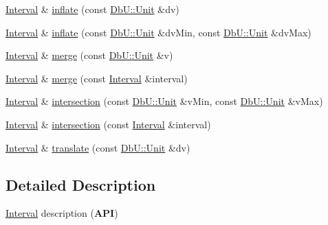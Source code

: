 \begin{DoxyCompactItemize}
\hyperlink{classHurricane_1_1Interval}{Interval} \& \hyperlink{classHurricane_1_1Interval_a142c3ec37ebe74c253b3fe0039ef2143}{inflate} (const \hyperlink{group__DbUGroup_ga4fbfa3e8c89347af76c9628ea06c4146}{Db\-U\-::\-Unit} \&dv)
\item 
\hyperlink{classHurricane_1_1Interval}{Interval} \& \hyperlink{classHurricane_1_1Interval_ac311880a39d8e3db79bcbc5d3bb341a6}{inflate} (const \hyperlink{group__DbUGroup_ga4fbfa3e8c89347af76c9628ea06c4146}{Db\-U\-::\-Unit} \&dv\-Min, const \hyperlink{group__DbUGroup_ga4fbfa3e8c89347af76c9628ea06c4146}{Db\-U\-::\-Unit} \&dv\-Max)
\item 
\hyperlink{classHurricane_1_1Interval}{Interval} \& \hyperlink{classHurricane_1_1Interval_a927e2fbaa8f38a069c6308f7cacc8ab5}{merge} (const \hyperlink{group__DbUGroup_ga4fbfa3e8c89347af76c9628ea06c4146}{Db\-U\-::\-Unit} \&v)
\item 
\hyperlink{classHurricane_1_1Interval}{Interval} \& \hyperlink{classHurricane_1_1Interval_ab6c2a46d4cb528ecb0d0eec2c4cec020}{merge} (const \hyperlink{classHurricane_1_1Interval}{Interval} \&interval)
\item 
\hyperlink{classHurricane_1_1Interval}{Interval} \& \hyperlink{classHurricane_1_1Interval_a0eeaaa7eb5b4ade89719c57a2c284909}{intersection} (const \hyperlink{group__DbUGroup_ga4fbfa3e8c89347af76c9628ea06c4146}{Db\-U\-::\-Unit} \&v\-Min, const \hyperlink{group__DbUGroup_ga4fbfa3e8c89347af76c9628ea06c4146}{Db\-U\-::\-Unit} \&v\-Max)
\item 
\hyperlink{classHurricane_1_1Interval}{Interval} \& \hyperlink{classHurricane_1_1Interval_a568a1e327e5e13d4b50ea16dab20b835}{intersection} (const \hyperlink{classHurricane_1_1Interval}{Interval} \&interval)
\item 
\hyperlink{classHurricane_1_1Interval}{Interval} \& \hyperlink{classHurricane_1_1Interval_aa2924c14832fd643bec8e8682faf7854}{translate} (const \hyperlink{group__DbUGroup_ga4fbfa3e8c89347af76c9628ea06c4146}{Db\-U\-::\-Unit} \&dv)
\end{DoxyCompactItemize}


\subsection{Detailed Description}
\hyperlink{classHurricane_1_1Interval}{Interval} description ({\bfseries A\-P\-I}) 

